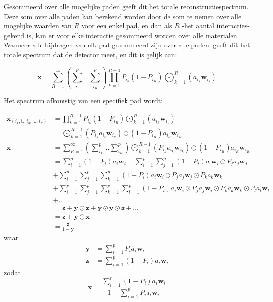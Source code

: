 \documentclass[12pt]{report}
\DeclareMathOperator*{\Odot}{\bigodot}
\begin{document}
Gesommeerd over alle mogelijke paden geeft dit het totale reconstructiespectrum. Deze som over alle paden kan berekend worden door de som te nemen over alle mogelijke waarden van $R$ voor een enkel pad, en dan als $R$ -het aantal interacties- gekend is, kan er voor elke interactie gesommeerd worden over alle materialen. Wanneer alle bijdragen van elk pad gesommeerd zijn over alle paden, geeft dit het totale spectrum dat de detector meet, en dit is gelijk aan:

\begin{equation}
\bm{x} = \sum_{R=1}^{\infty} \left(\sum_{i_1}^{p} ... \sum_{i_R}^{p}\right)\prod_{k=1}^{R-1} P_{i_k} \left(1-P_{i_R}\right)  \Odot_{k=1}^R \left(a_{i_k} \bm{w}_{i_k}\right)
\end{equation}



Het spectrum afkomstig van een specifiek pad wordt:

\begin{align}
\bm{x}_{(i_1,i_2,i_3,...,i_R)} &= \prod_{k=1}^{R-1}P_{i_k} (1-P_{i_R}) \Odot_{k=1}^R \left(a_{i_k} \bm{w}_{i_k}\right) \\
&= \Odot_{k=1}^{R-1} \left(P_{i_k}a_{i_k} \bm{w}_{i_k}\right) \odot (1-P_{i_R}) a_{i_R} \bm{w}_{i_R} \\
\bm{x} &= \sum_{R=1}^{\infty} \left(\sum_{i_1}^{p} ... \sum_{i_R}^{p}\right) \Odot_{k=1}^{R-1} \left(P_{i_k}a_{i_k} \bm{w}_{i_k}\right) \odot (1-P_{i_R}) a_{i_R} \bm{w}_{i_R} \\
&= \sum_{i=1}^p (1-P_i) a_{i} \bm{w}_{i} + \sum_{i=1}^p \sum_{j=1}^p (1-P_i) a_{i} \bm{w}_{i} \odot P_j a_{j} \bm{w}_{j} \nonumber\\&+ \sum_{i=1}^p \sum_{j=1}^p \sum_{k=1}^p (1-P_i) a_{i} \bm{w}_{i} \odot P_j a_{j} \bm{w}_{j} \odot P_k a_{k} \bm{w}_{k} \nonumber\\&+ \sum_{i=1}^p \sum_{j=1}^p \sum_{k=1}^p  \sum_{l=1}^p (1-P_i) a_{i} \bm{w}_{i} \odot P_j a_{j} \bm{w}_{j} \odot P_k a_{k} \bm{w}_{k} \odot P_l a_{l} \bm{w}_{l} \nonumber \\& + ... \\
&= \bm{z} + \bm{y}\odot\bm{z} + \bm{y}\odot\bm{y}\odot\bm{z} + ... \\
&= \bm{z} + \bm{y}\odot\bm{x} \\
 &= \frac{\bm{z}}{1-\bm{y}}
\end{align}
waar
\begin{align}
\bm{y} &= \sum_{i=1}^p P_i a_{i} \bm{w}_{i} \\
\bm{z} &= \sum_{i=1}^p (1-P_i) a_{i} \bm{w}_{i} 
\end{align}
zodat
\begin{equation}
\bm{x} = \frac{\sum_{i=1}^p (1-P_i) a_{i} \bm{w}_{i}}{1-\sum_{i=1}^p P_i a_{i} \bm{w}_{i}} \label{eq:Pi}
\end{equation}
\end{document}
